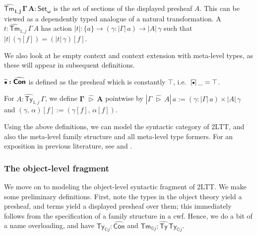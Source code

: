 \documentclass[acmsmall]{acmart}
\newcommand{\msf}[1]{\mathsf{#1}}
\newcommand{\mbb}[1]{\mathbb{#1}}
\newcommand{\bs}[1]{\boldsymbol{#1}}
\newcommand{\wh}[1]{\widehat{#1}}
\newcommand{\ext}{\triangleright}
\newcommand{\y}{\msf{y}}
\newcommand{\mbbo}{\mbb{O}}
\renewcommand{\U}{\msf{U}}
\newcommand{\Ty}{\msf{Ty}}
\newcommand{\Tm}{\msf{Tm}}
\newcommand{\hCon}{\wh{\msf{Con}}}
\newcommand{\hTy}{\wh{\msf{Ty}}}
\newcommand{\hTm}{\wh{\msf{Tm}}}
\newcommand{\emptycon}{\scaleobj{.75}\bullet}
\newcommand{\Set}{\mathsf{Set}}
\theoremstyle{remark}
\begin{document}
\begin{definition}
  $\bs{\hTm_{1,j}\,\Gamma\,A : \Set_\omega}$ is the set of sections of the
  displayed presheaf $A$. This can be viewed as a dependently typed analogue of
  a natural transformation.  A $t : \hTm_{1,j}\,\Gamma\,A$ has action $|t| :
  \{a\} \to (\gamma : |\Gamma|\,a) \to |A|\,\gamma$ such that $|t|\,(\gamma[f])
  = (|t|\,\gamma)[f]$.
\end{definition}


We also look at he empty context and context extension with meta-level types,
as these will appear in subsequent definitions.

\begin{definition}
$\bs{{\widehat{\emptycon}} : \hCon}$ is defined as the presheaf
which is constantly $\top$, i.e.\ $|\wh{\emptycon}|\,\_ = \top$.
\end{definition}

\begin{definition} For $A : \hTy_{1,j}\,\Gamma$, we define $\bs{\Gamma\,\,\wh{\ext}\,A}$
pointwise by $|\Gamma\,\,\wh{\ext}\,A|\,a := (\gamma : |\Gamma|\,a) \times |A|\,\gamma$
and $(\gamma,\,\alpha)[f] := (\gamma[f],\,\alpha[f])$.
\end{definition}

Using the above definitions, we can model the syntactic category of 2LTT, and
also the meta-level family structure and all meta-level type formers. For an
exposition in previous literature, see \cite{TODO} and \cite{TODO}.

\subsubsection{The object-level fragment}

We move on to modeling the object-level syntactic fragment of 2LTT. We make some
preliminary definitions. First, note the types in the object theory yield a
presheaf, and terms yield a displayed presheaf over them; this immediately
follows from the specification of a family structure in a cwf. Hence, we do a
bit of a name overloading, and have $\Ty_{\mbbo j} : \hCon$ and $\Tm_{\mbbo j} : \hTy\,\Ty_{\mbbo j}$.
\end{document}
